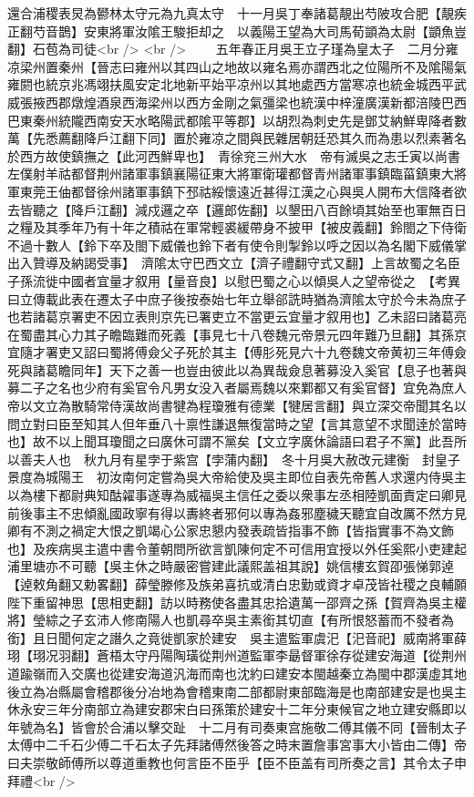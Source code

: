 還合浦稷表炅為鬰林太守元為九真太守　十一月吳丁奉諸葛靚出芍陂攻合肥【靚疾正翻芍音鵲】安東將軍汝隂王駿拒却之　以義陽王望為大司馬荀顗為太尉【顗魚豈翻】石苞為司徒<br />
<br />
　　五年春正月吳王立子瑾為皇太子　二月分雍凉梁州置秦州【晉志曰雍州以其四山之地故以雍名焉亦謂西北之位陽所不及隂陽氣雍閼也統京兆馮翊扶風安定北地新平始平凉州以其地處西方當寒凉也統金城西平武威張掖西郡燉煌酒泉西海梁州以西方金剛之氣彊梁也統漢中梓潼廣漢新都涪陵巴西巴東秦州統隴西南安天水略陽武都隂平等郡】以胡烈為刺史先是鄧艾納鮮卑降者數萬【先悉薦翻降戶江翻下同】置於雍凉之間與民雜居朝廷恐其久而為患以烈素著名於西方故使鎮撫之【此河西鮮卑也】　青徐兖三州大水　帝有滅吳之志壬寅以尚書左僕射羊祜都督荆州諸軍事鎮襄陽征東大將軍衛瓘都督青州諸軍事鎮臨菑鎮東大將軍東莞王伷都督徐州諸軍事鎮下邳祜綏懷遠近甚得江漢之心與吳人開布大信降者欲去皆聽之【降戶江翻】減戍邏之卒【邏郎佐翻】以墾田八百餘頃其始至也軍無百日之糧及其季年乃有十年之積祜在軍常輕裘緩帶身不披甲【被皮義翻】鈴閤之下侍衛不過十數人【鈴下卒及閤下威儀也鈴下者有使令則掣鈴以呼之因以為名閣下威儀掌出入贊導及納謁受事】　濟隂太守巴西文立【濟子禮翻守式又翻】上言故蜀之名臣子孫流徙中國者宜量才叙用【量音良】以慰巴蜀之心以傾吳人之望帝從之　【考異曰立傳載此表在遷太子中庶子後按泰始七年立舉郤詵時猶為濟隂太守於今未為庶子也若諸葛京署吏不因立表則京先已署吏立不當更云宜量才叙用也】乙未詔曰諸葛亮在蜀盡其心力其子瞻臨難而死義【事見七十八卷魏元帝景元四年難乃旦翻】其孫京宜隨才署吏又詔曰蜀將傅僉父子死於其主【傅肜死見六十九卷魏文帝黄初三年傅僉死與諸葛瞻同年】天下之善一也豈由彼此以為異哉僉息著募没入奚官【息子也著與募二子之名也少府有奚官令凡男女没入者屬焉魏以來鄴都又有奚官督】宜免為庶人　帝以文立為散騎常侍漢故尚書犍為程瓊雅有德業【犍居言翻】與立深交帝聞其名以問立對曰臣至知其人但年垂八十禀性謙退無復當時之望【言其意望不求聞逹於當時也】故不以上聞耳瓊聞之曰廣休可謂不黨矣【文立字廣休論語曰君子不黨】此吾所以善夫人也　秋九月有星孛于紫宫【孛蒲内翻】　冬十月吳大赦改元建衡　封皇子景度為城陽王　初汝南何定嘗為吳大帝給使及吳主即位自表先帝舊人求還内侍吳主以為樓下都尉典知酤糴事遂專為威福吳主信任之委以衆事左丞相陸凱面責定曰卿見前後事主不忠傾亂國政寧有得以夀終者邪何以專為姦邪塵穢天聽宜自改厲不然方見卿有不測之禍定大恨之凱竭心公家忠懇内發表疏皆指事不飾【皆指實事不為文飾也】及疾病吳主遣中書令董朝問所欲言凱陳何定不可信用宜授以外任奚熙小吏建起浦里塘亦不可聽【吳主休之時嚴密嘗建此議熙盖祖其說】姚信樓玄賀卲張悌郭逴【逴敕角翻又勅畧翻】薛瑩滕修及族弟喜抗或清白忠勤或資才卓茂皆社稷之良輔願陛下重留神思【思相吏翻】訪以時務使各盡其忠拾遺萬一邵齊之孫【賀齊為吳主權將】瑩綜之子玄沛人修南陽人也凱尋卒吳主素銜其切直【有所恨怒蓄而不發者為銜】且日聞何定之譖久之竟徙凱家於建安　吳主遣監軍虞汜【汜音祀】威南將軍薛珝【珝况羽翻】蒼梧太守丹陽陶璜從荆州道監軍李朂督軍徐存從建安海道【從荆州道踰嶺而入交廣也從建安海道汎海而南也沈約曰建安本閩越秦立為閩中郡漢虛其地後立為冶縣屬會稽郡後分冶地為會稽東南二部都尉東部臨海是也南部建安是也吳主休永安三年分南部立為建安郡宋白曰孫策於建安十二年分東候官之地立建安縣即以年號為名】皆會於合浦以擊交趾　十二月有司奏東宫施敬二傅其儀不同【晉制太子太傅中二千石少傅二千石太子先拜諸傅然後答之時末置詹事宮事大小皆由二傳】帝曰夫崇敬師傅所以尊道重教也何言臣不臣乎【臣不臣盖有司所奏之言】其令太子申拜禮<br />
